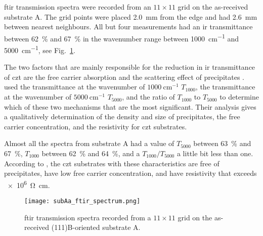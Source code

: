 \Ac{ftir} transmission spectra were recorded from an $11\times11$ grid on the as-received substrate A. The grid points were placed \SI{2.0}{\milli\metre} from the edge and had \SI{2.6}{\milli\metre} between nearest neighbours. All but four measurements had an \ac{ir} transmittance between \SI{62}{\percent} and \SI{67}{\percent} in the wavenumber range between \SI{1000}{\centi\metre^{-1}} and \SI{5000}{\centi\metre^{-1}}, see Fig.~\ref{fig:subAa_ftir_spectrum}.

The two factors that are mainly responsible for the reduction in \ac{ir} transmittance of \ac{czt} are the free carrier absorption and the scattering effect of precipitates \citep{yadava1994precipitation}. \citet{yujie2004infrared} used the transmittance at the wavenumber of $\SI{1000}{\centi\metre^{-1}}$ $T_{1000}$, the transmittance at the wavenumber of $\SI{5000}{\centi\metre^{-1}}$ $T_{5000}$, and the ratio of $T_{1000}$ to $T_{5000}$ to determine which of these two mechanisms that are the most significant. Their analysis gives a qualitatively determination of the density and size of  precipitates, the free carrier concentration, and the resistivity for \ac{czt} substrates.

Almost all the spectra from substrate A had a value of $T_{5000}$ between \SI{63}{\percent} and \SI{67}{\percent}, $T_{1000}$ between \SI{62}{\percent} and \SI{64}{\percent}, and a $T_{1000}/T_{5000}$ a little bit less than one. According to \citet{yujie2004infrared}, the \ac{czt} substrates with these characteristics are free of precipitates, have low free carrier concentration, and have resistivity that exceeds \SI{e6}{\ohm\centi\metre}.

\begin{figure}[htbp]
    \centering
    \texttt{[image: subAa\_ftir\_spectrum.png]}
    \caption[\Ac{ftir} transmission spectra for the as-received substrate A.]{\Acf{ftir} transmission spectra recorded from a $11\times11$ grid on the as-received (111)B-oriented substrate A.}
    \label{fig:subAa_ftir_spectrum}
\end{figure}

